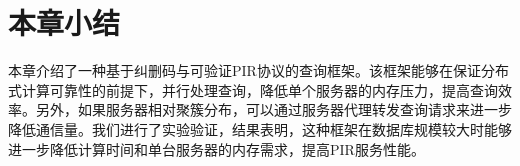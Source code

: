\section{本章小结}

本章介绍了一种基于纠删码与可验证PIR协议的查询框架。该框架能够在保证分布式计算可靠性的前提下，并行处理查询，降低单个服务器的内存压力，提高查询效率。另外，如果服务器相对聚簇分布，可以通过服务器代理转发查询请求来进一步降低通信量。我们进行了实验验证，结果表明，这种框架在数据库规模较大时能够进一步降低计算时间和单台服务器的内存需求，提高PIR服务性能。